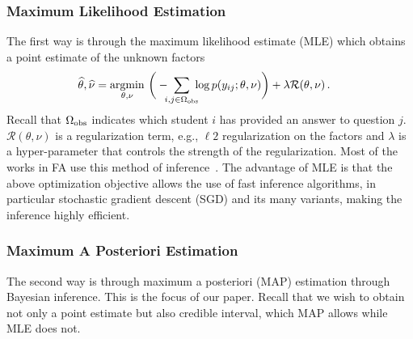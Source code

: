\documentclass{edm_article}
\begin{document}
\subsubsection{Maximum Likelihood Estimation}
The first way is through the maximum likelihood estimate (MLE) which obtains a point estimate of the unknown factors
\begin{align}
    \widehat{\theta},\widehat{\nu} 
    &= \underset{\theta,\nu}{\rm argmin}\,\,\bigg(-\hspace{-5pt}\sum_{i,j\in\Omega_{\rm obs}}\hspace{-5pt} {\rm log}\,p(y_{ij} ; \theta,\nu)\bigg) +  \lambda \mathcal{R}(\theta,\nu) \,.\label{eq:mle}
\end{align}
Recall that $\Omega_{\rm obs}$ indicates which student $i$ has provided an answer to question $j$. $\mathcal{R}(\theta,\nu)$ is a regularization term, e.g., $\ell2$ regularization on the factors and $\lambda$ is a hyper-parameter that controls the strength of the regularization. Most of the works in FA use this method of inference~\cite{LFA,PFA,chi2011instructional,vie2019knowledge,das3h,lindsey2014improving,mozer2016predicting}. The advantage of MLE is that the above optimization objective allows the use of fast inference algorithms, in particular stochastic gradient descent (SGD) and its many variants, making the inference highly efficient.

\subsubsection{Maximum A Posteriori Estimation}
\label{sec:bayes}
The second way is through maximum a posteriori (MAP) estimation through Bayesian inference. This is the focus of our paper. Recall that we wish to obtain not only a point estimate but also credible interval, which MAP allows while MLE does not. 
\end{document}
